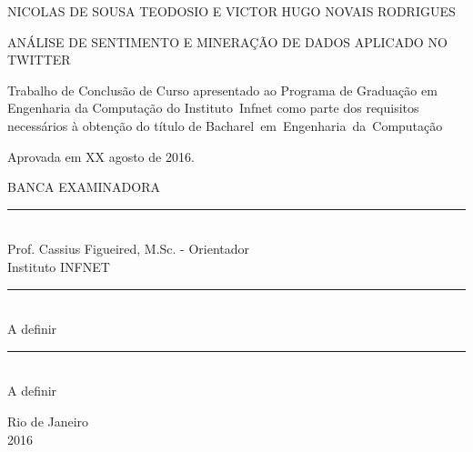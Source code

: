 %



\cleardoublepage
\thispagestyle{empty}

\vspace{-60mm}

\begin{center}
   {\large NICOLAS DE SOUSA TEODOSIO E VICTOR HUGO NOVAIS RODRIGUES}\\
   \vspace{7mm}

  ANÁLISE DE SENTIMENTO E MINERAÇÃO DE DADOS APLICADO NO TWITTER\\
 \vspace{8mm}  %
\end{center}

\noindent
\begin{flushright}
\begin{minipage}[t]{8cm} 

Trabalho de Conclusão de Curso apresentado ao Programa de Graduação em Engenharia da Computação do \mbox{Instituto Infnet} como parte dos requisitos
necessários à obtenção do título de \mbox{Bacharel em Engenharia da Computação}

\end{minipage}
\end{flushright}
\vspace{ 5mm}  %
\noindent
Aprovada em XX agosto de 2016. \\
\begin{flushright}
  \parbox{15cm}
  {
  \begin{center}
  BANCA EXAMINADORA \\
  \vspace{5mm}
  \rule{11cm}{.1mm} \\
	Prof. Cassius Figueired, M.Sc. - Orientador \\ 
	Instituto INFNET \\
  \vspace{5mm}
  \rule{11cm}{.1mm} \\
    A definir \\ 
  \vspace{5mm}
  \rule{11cm}{.1mm} \\
    A definir \\ 
  \end{center}
  }
\end{flushright}
\begin{center}
  \vspace{4mm} %
 Rio de Janeiro \\
  2016
\end{center}

